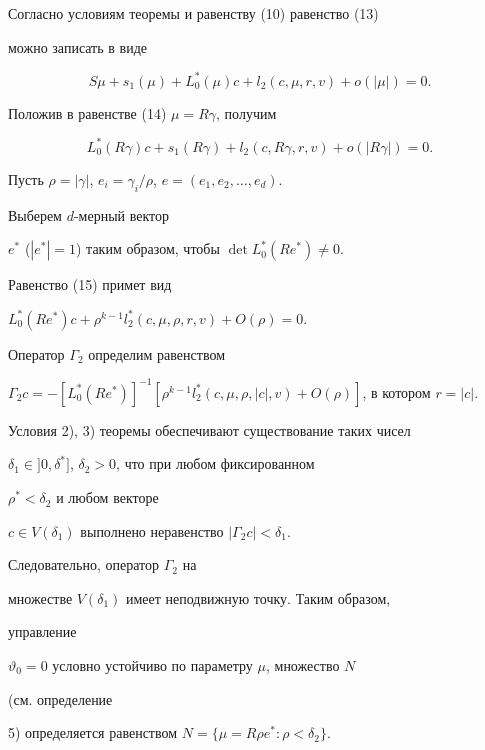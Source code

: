 \begin{pf} 


Согласно условиям теоремы и равенству (10) равенство (13) 


можно записать в виде 


\begin{equation} 


S\mu+s_1(\mu)+L^*_0(\mu)c+l_2(c,\mu,r,v)+o(|\mu|)=0. 


\end{equation} 


Положив в равенстве (14) $\mu=R\gamma$, получим 


\begin{equation} 


L^*_0(R\gamma)c+s_1(R\gamma)+l_2(c,R\gamma,r,v)+ 


o(|R\gamma|)=0. 


\end{equation} 


Пусть $\rho=|\gamma|$, $e_i=\gamma_i/\rho$, $e=(e_1,e_2,\dotsc,e_d)$. 


Выберем $d$-мерный вектор 


$e^*$ ($|e^*|=1$) таким образом, чтобы $\det L^*_0(Re^*)\ne0$. 


Равенство (15) примет вид 


$L^*_0(Re^*)c+\rho^{k-1}l^*_2(c,\mu,\rho,r,v)+O(\rho)=0$. 


Оператор $\Gamma_2$ определим равенством 


$\Gamma_2c=-[L^*_0(Re^*)]^{-1}[\rho^{k-1}l^*_2(c,\mu,\rho,|c|,v)+ 


O(\rho)]$, в котором $r=|c|$. 


 


Условия 2), 3) теоремы обеспечивают существование таких чисел 


$\delta_1\in]0,\delta^*]$, $\delta_2>0$, что при любом фиксированном 


$\rho^*<\delta_2$ и любом векторе 


$c\in V(\delta_1)$ выполнено неравенство $|\Gamma_2c|<\delta_1$. 


Следовательно, оператор $\Gamma_2$ на 


множестве $V(\delta_1)$ имеет неподвижную точку. Таким образом, 


управление 


$\vartheta_0=0$ условно устойчиво по параметру $\mu$, множество $N$ 


(см. определение 


5) определяется равенством $N=\{\mu=R\rho e^*:\rho<\delta_2\}$. 


\end{pf} 


